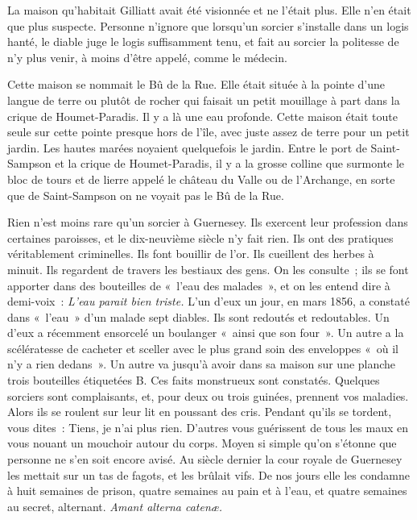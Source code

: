 \documentclass[french,twoside]{book} %
\begin{document}
La maison qu’habitait Gilliatt avait été visionnée et ne l’était plus. Elle n’en était que plus suspecte. Personne n’ignore que lorsqu’un sorcier s’installe dans un logis hanté, le diable juge le logis suffisamment tenu, et fait au sorcier la politesse de n’y plus venir, à moins d’être appelé, comme le médecin.\par
Cette maison se nommait le Bû de la Rue. Elle était située à la pointe d’une langue de terre ou plutôt de rocher qui faisait un petit mouillage à part dans la crique de Houmet-Paradis. Il y a là une eau profonde. Cette maison était toute seule sur cette pointe presque  hors de l’île, avec juste assez de terre pour un petit jardin. Les hautes marées noyaient quelquefois le jardin. Entre le port de Saint-Sampson et la crique de Houmet-Paradis, il y a la grosse colline que surmonte le bloc de tours et de lierre appelé le château du Valle ou de l’Archange, en sorte que de Saint-Sampson on ne voyait pas le Bû de la Rue.\par
Rien n’est moins rare qu’un sorcier à Guernesey. Ils exercent leur profession dans certaines paroisses, et le dix-neuvième siècle n’y fait rien. Ils ont des pratiques véritablement criminelles. Ils font bouillir de l’or. Ils cueillent des herbes à minuit. Ils regardent de travers les bestiaux des gens. On les consulte ; ils se font apporter dans des bouteilles de « l’eau des malades », et on les entend dire à demi-voix : \emph{L’eau parait bien triste.} L’un d’eux un jour, en mars 1856, a constaté dans « l’eau » d’un malade sept diables. Ils sont redoutés et redoutables. Un d’eux a récemment ensorcelé un boulanger « ainsi que son four ». Un autre a la scélératesse de cacheter et sceller avec le plus grand soin des enveloppes « où il n’y a rien dedans ». Un autre va jusqu’à avoir dans sa maison sur une planche trois bouteilles étiquetées B. Ces faits monstrueux sont constatés. Quelques sorciers sont complaisants, et, pour deux ou trois guinées, prennent vos maladies. Alors ils se roulent sur leur lit en poussant des cris. Pendant qu’ils se tordent, vous dites : Tiens, je n’ai plus rien. D’autres vous guérissent de tous les maux en vous nouant un mouchoir autour du corps. Moyen si simple qu’on s’étonne que personne ne s’en soit  encore avisé. Au siècle dernier la cour royale de Guernesey les mettait sur un tas de fagots, et les brûlait vifs. De nos jours elle les condamne à huit semaines de prison, quatre semaines au pain et à l’eau, et quatre semaines au secret, alternant. \emph{Amant alterna catenæ.}\par
\end{document}
